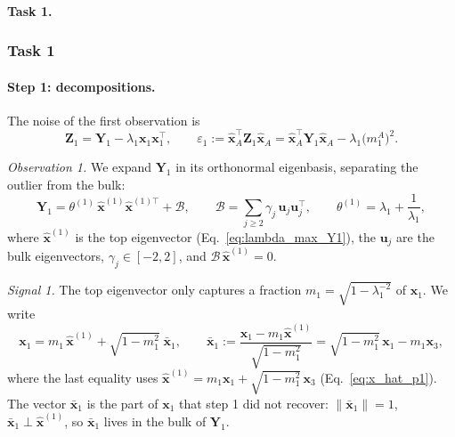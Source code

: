 \paragraph{Task 1.}
\subsubsection{Task 1}

\paragraph{Step 1: decompositions.}
The noise of the first observation is
\begin{equation}
  \mathbf{Z}_1 = \mathbf{Y}_1 - \lambda_1 \boldsymbol{x}_1\boldsymbol{x}_1^\top,
  \qquad
  \varepsilon_1 := \hat{\boldsymbol{x}}_A^\top \mathbf{Z}_1 \hat{\boldsymbol{x}}_A
  = \hat{\boldsymbol{x}}_A^\top \mathbf{Y}_1 \hat{\boldsymbol{x}}_A - \lambda_1 \big(m_1^A\big)^2 .
  \label{eq:eps1_def}
\end{equation}

\emph{Observation 1.} We expand $\mathbf{Y}_1$ in its orthonormal eigenbasis, separating the outlier from the bulk:
\begin{equation}
  \mathbf{Y}_1 = \theta^{(1)}\, \hat{\boldsymbol{x}}^{(1)}\hat{\boldsymbol{x}}^{(1)\top} + \mathcal{B},
  \qquad
  \mathcal{B} = \sum_{j\geq 2} \gamma_j\, \boldsymbol{u}_j\boldsymbol{u}_j^\top,
  \qquad
  \theta^{(1)} = \lambda_1 + \frac{1}{\lambda_1},
  \label{eq:Y1_expansion}
\end{equation}
where $\hat{\boldsymbol{x}}^{(1)}$ is the top eigenvector (Eq.~\eqref{eq:lambda_max_Y1}), the $\boldsymbol{u}_j$ are the bulk eigenvectors,
$\gamma_j \in [-2, 2]$, and $\mathcal{B}\,\hat{\boldsymbol{x}}^{(1)} = 0$.

\emph{Signal 1.} The top eigenvector only captures a fraction $m_1 = \sqrt{1-\lambda_1^{-2}}$ of $\boldsymbol{x}_1$.
We write
\begin{equation}
  \boldsymbol{x}_1 = m_1\, \hat{\boldsymbol{x}}^{(1)} + \sqrt{1-m_1^2}\; \bar{\boldsymbol{x}}_1,
  \qquad
  \bar{\boldsymbol{x}}_1 := \frac{\boldsymbol{x}_1 - m_1 \hat{\boldsymbol{x}}^{(1)}}{\sqrt{1-m_1^2}}
  = \sqrt{1-m_1^2}\,\boldsymbol{x}_1 - m_1 \boldsymbol{x}_3 ,
  \label{eq:x1_expansion}
\end{equation}
where the last equality uses $\hat{\boldsymbol{x}}^{(1)} = m_1\boldsymbol{x}_1 + \sqrt{1-m_1^2}\,\boldsymbol{x}_3$ (Eq.~\eqref{eq:x_hat_p1}).
The vector $\bar{\boldsymbol{x}}_1$ is the part of $\boldsymbol{x}_1$ that step 1 did not recover:
$\|\bar{\boldsymbol{x}}_1\| = 1$, $\bar{\boldsymbol{x}}_1 \perp \hat{\boldsymbol{x}}^{(1)}$, so $\bar{\boldsymbol{x}}_1$ lives in the bulk of $\mathbf{Y}_1$.

